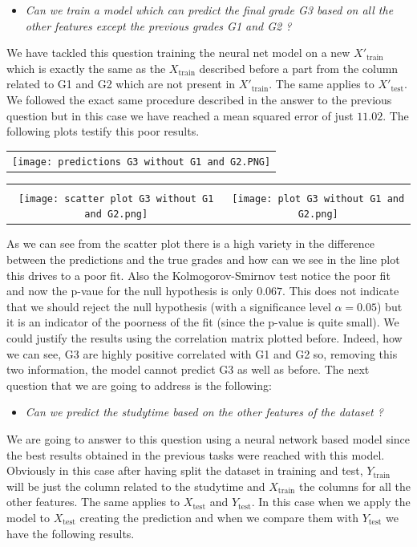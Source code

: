 \documentclass[a4paper, 11pt]{report}
\theoremstyle{definition}
\numberwithin{equation}{section}		%
\numberwithin{figure}{section}			%
\numberwithin{table}{section}				%
\begin{document}
\begin{itemize}
    \item \textit{Can we train a model which can predict the final grade G3 based on all the other features except the previous grades G1 and G2 ?}
\end{itemize}
We have tackled this question training the neural net model on a new $X'_{\text{train}}$ which is exactly the same as the $X_{\text{train}}$ described before a part from the column related to G1 and G2 which are not present in $X'_{\text{train}}$. The same applies to $X'_{\text{test}}$. We followed the exact same procedure described in the answer to the previous question but in this case we have reached a mean squared error of just $11.02$. The following plots testify this poor results.
\newline
    \begin{frame}
      \centering
        \begin{tabular}{c}
         \\
        \texttt{[image: predictions G3 without G1 and G2.PNG]}
      \end{tabular}

      \vspace{0.05em}
        \begin{tabular}{cc}
          &  \\
        \texttt{[image: scatter plot G3 without G1 and G2.png]}
         &
         \texttt{[image: plot G3 without G1 and G2.png]}
         \end{tabular}
    \end{frame}
\newline
As we can see from the scatter plot there is a high variety in the difference between the predictions and the true grades and how can we see in the line plot this drives to a poor fit. Also the Kolmogorov-Smirnov test notice the poor fit and now the p-vaue for the null hypothesis is only $0.067$. This does not indicate that we should reject the null hypothesis (with a significance level $\alpha = 0.05$) but it is an indicator of the poorness of the fit (since the p-value is quite small).
We could justify the results using the correlation matrix plotted before. Indeed, how we can see, G3 are highly positive correlated with G1 and G2 so, removing this two information, the model cannot predict G3 as well as before.
The next question that we are going to address is the following:
\begin{itemize}
    \item \textit{Can we predict the studytime based on the other features of the dataset ?}
\end{itemize}
We are going to answer to this question using a neural network based model since the best results obtained in the previous tasks were reached with this model. Obviously in this case after having split the dataset in training and test, $Y_{\text{train}}$ will be just the column related to the studytime and $X_{\text{train}}$ the columns for all the other features. The same applies to $X_{\text{test}}$ and $Y_{\text{test}}$. In this case when we apply the model to $X_{\text{test}}$ creating the prediction and when we compare them with $Y_{\text{test}}$ we have the following results.
\end{document}
